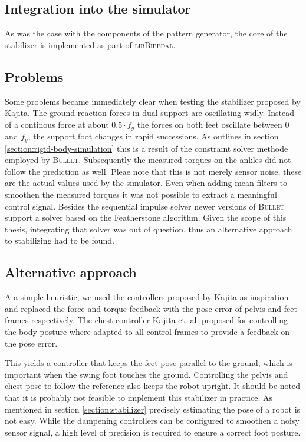 \documentclass[english,ngerman]{KITreprt}
\newcommand{\name}[1]{\textsc{#1}}
\begin{document}
\subsection{Integration into the
simulator}\label{integration-into-the-simulator}

As was the case with the components of the pattern generator, the core
of the stabilizer is implemented as part of \name{libBipedal}.

\subsection{Problems}\label{problems}

Some problems became immediately clear when testing the stabilizer
proposed by Kajita. The ground reaction forces in dual support are
oscillating widly. Instead of a continous force at about $0.5 \cdot f_g$
the forces on both feet oscillate between $0$ and $f_g$, the support
foot changes in rapid successions. As outlines in section
\ref{section:rigid-body-simulation} this is a result of the constraint
solver methode employed by \name{Bullet}. Subsequently the measured
torques on the ankles did not follow the prediction as well. Pleae note
that this is not merely sensor noise, these are the actual values used
by the simulator. Even when adding mean-filters to smoothen the measured
torques it was not possible to extract a meaningful control signal.
Besides the sequential impulse solver newer versions of \name{Bullet}
support a solver based on the Featherstone algorithm. Given the scope of
this thesis, integrating that solver was out of question, thus an
alternative approach to stabilizing had to be found.

\subsection{Alternative approach}\label{section:alternative-approach}

A a simple heuristic, we used the controllers proposed by Kajita as
inspiration and replaced the force and torque feedback with the pose
error of pelvis and feet frames respectively. The chest controller
Kajita et. al. proposed for controlling the body posture where adapted
to all control frames to provide a feedback on the pose error.

This yields a controller that keeps the feet pose parallel to the
ground, which is important when the swing foot touches the ground.
Controlling the pelvis and chest pose to follow the reference also keeps
the robot upright. It should be noted that it is probably not feasible
to implement this stabilizer in practice. As mentioned in section
\ref{section:stabilizer} precisely estimating the pose of a robot is not
easy. While the dampening controllers can be configured to smoothen a
noisy sensor signal, a high level of precision is required to ensure a
correct foot posture.
\end{document}
